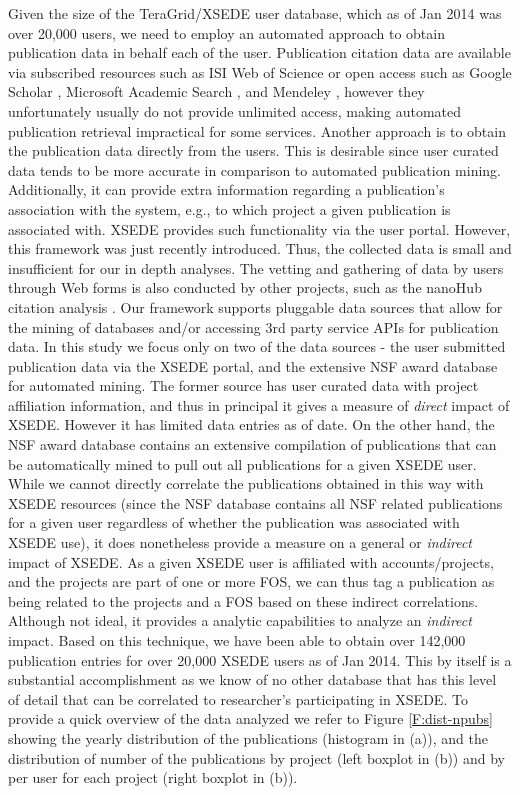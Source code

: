 \documentclass{sig-alternate}
\begin{document}
Given the size of the TeraGrid/XSEDE user database, which as of Jan 2014 was over 20,000 users, we need to employ an automated approach to obtain publication data in behalf each of the user. Publication citation data are available via subscribed resources such as ISI Web of Science \cite{www-isiwos} or open access such as Google Scholar \cite{www-googlescholar}, Microsoft Academic Search \cite{www-msas}, and Mendeley \cite{www-mendeley}, however they unfortunately usually do not provide unlimited access, making automated publication retrieval impractical for some services.  Another approach is to obtain the publication data directly from the users. This is desirable since user curated data tends to be more accurate in comparison to automated publication mining. Additionally, it can provide extra information regarding a publication's association with the system, e.g., to which project a given publication is associated with. XSEDE provides such functionality via the user portal. However, this framework was just recently introduced. Thus, the collected data is small and insufficient for our in depth analyses. The vetting and gathering of data by users through Web forms is also conducted by other projects, such as the nanoHub citation analysis \cite{www-nanohubcite}.  Our framework supports pluggable data sources that allow for the mining of databases and/or accessing 3rd party service APIs for publication data. In this study we focus only on two of the data sources - the user submitted publication data via the XSEDE portal, and the extensive NSF award database for automated mining. The former source has user curated data with project affiliation information, and thus in principal it gives a measure of \emph{direct} impact of XSEDE. However it has limited data entries as of date. On the other hand, the NSF award database contains an extensive compilation of publications that can be automatically mined to pull out all publications for a given XSEDE user. While we cannot directly correlate the publications obtained in this way with XSEDE resources (since the NSF database contains all NSF related publications for a given user regardless of whether the publication was associated with XSEDE use), it does nonetheless provide a measure on a general or \emph{indirect} impact of XSEDE. As a given XSEDE user is affiliated with accounts/projects, and the projects are part of one or more FOS, we can thus tag a publication as being related to the projects and a FOS based on these indirect correlations. Although not ideal, it provides a analytic capabilities to analyze an \emph{indirect} impact.  Based on this technique, we have been able to obtain over 142,000 publication entries for over 20,000 XSEDE users as of Jan 2014.  This by itself is a substantial accomplishment as we know of no other database that has this level of detail that can be correlated to researcher's participating in XSEDE. To provide a quick overview of the data analyzed we refer to Figure \ref{F:dist-npubs} showing the yearly distribution of the publications (histogram in (a)), and the distribution of number of the publications by project (left boxplot in (b)) and by per user for each project (right boxplot in (b)).
 
\end{document}
